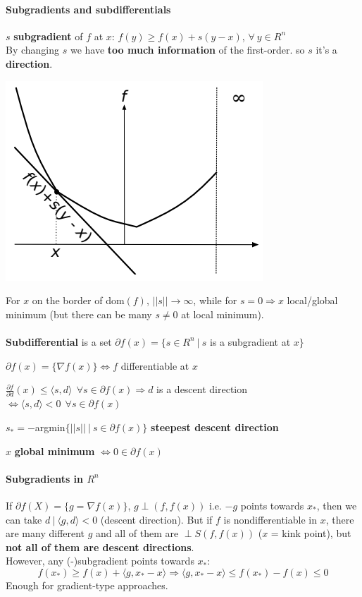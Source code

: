 \documentclass[10pt]{report}
\begin{document}
\paragraph{Subgradients and subdifferentials} $s$ \textbf{subgradient} of $f$ at $x$: $f(y)\geq f(x) + s(y-x)$, $\forall\:y\in R^n$\\
By changing $s$ we have \textbf{too much information} of the first-order. so $s$ it's a \textbf{direction}.
\begin{center}
	\includegraphics[scale=0.5]{7.png}
\end{center}
For $x$ on the border of dom$(f)$, $||s||\rightarrow\infty$, while for $s=0\Rightarrow x$ local/global minimum (but there can be many $s\neq 0$ at local minimum).\\\\
\textbf{Subdifferential} is a set $\partial f(x) =\{s\in R^n\:|\:s$ is a subgradient at $x\}$
\begin{list}{}{}
	\item $\partial f(x) = \{\nabla f(x)\}\Leftrightarrow f$ differentiable at $x$
	\item $\frac{\partial f}{\partial d}(x) \leq \langle s,d\rangle\:\:\forall s \in \partial f(x)\Rightarrow d$ is a descent direction $\Leftrightarrow \langle s,d\rangle < 0\:\: \forall s\in\partial f(x)$
	\item $s_* = -$argmin$\{||s||\:|\:s\in\partial f(x)\}$ \textbf{steepest descent direction}
	\item $x$ \textbf{global minimum} $\Leftrightarrow 0\in \partial f(x)$
\end{list}
\paragraph{Subgradients in $R^n$} If $\partial f(X) = \{g=\nabla f(x)\}$, $g\perp (f,f(x))$ i.e. $-g$ points towards $x_*$, then we can take $d\:|\:\langle g,d\rangle < 0$ (descent direction). But if $f$ is nondifferentiable in $x$, there are many different $g$ and all of them are $\perp S(f,f(x))$ ($x$ = kink point), but \textbf{not all of them are descent directions}.\\
However, any (-)subgradient points towards $x_*$:
$$f(x_*)\geq f(x)+\langle g,x_*-x\rangle\Rightarrow \langle g,x_*-x\rangle\leq f(x_*)-f(x)\leq 0$$
Enough for gradient-type approaches.
\end{document}
